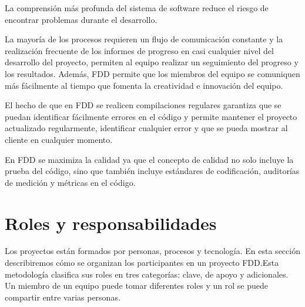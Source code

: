 \documentclass[11pt]{article}
\begin{document}
La comprensión más profunda del sistema de software reduce el riesgo de encontrar problemas durante el desarrollo.

La mayoría de los procesos requieren un flujo de comunicación constante y la realización frecuente de los informes de progreso en casi cualquier nivel del desarrollo del proyecto, permiten al equipo realizar un seguimiento del progreso y los resultados. Además, FDD permite que los miembros del equipo se comuniquen más fácilmente al tiempo que fomenta la creatividad e innovación del equipo.

El hecho de que en FDD se realicen compilaciones regulares garantiza que se puedan identificar fácilmente errores en el código y permite mantener el proyecto actualizado regularmente, identificar cualquier error y que se pueda mostrar al cliente en cualquier momento. 

En FDD se maximiza la calidad ya que el concepto de calidad no solo incluye la prueba del código, sino que también incluye estándares de codificación, auditorías de medición y métricas en el código.

\section{Roles y responsabilidades}

Los proyectos están formados por personas, procesos y tecnología. En esta sección describiremos cómo se organizan los participantes en un proyecto FDD.Esta metodología clasifica sus roles en tres categorías: clave, de apoyo y adicionales. Un miembro de un equipo puede tomar diferentes roles y un rol se puede compartir entre varias personas.\\
\end{document}
